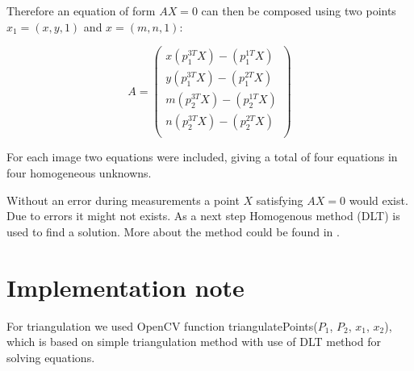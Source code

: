 Therefore an equation of form $AX = 0$ can then be composed using two points $x_1 = (x, y, 1)$ and $x = (m, n, 1)$:

\[
A = \begin{pmatrix}
x(p_1^{3T}X) - (p_1^{1T}X) \\
y(p_1^{3T}X) - (p_1^{2T}X) \\
m(p_2^{3T}X) - (p_2^{1T}X) \\
n(p_2^{3T}X) - (p_2^{2T}X) \\
\end{pmatrix}
\]

For each image two equations were included, giving a total of four equations in
four homogeneous unknowns.

Without an error during measurements a point $X$ satisfying $AX = 0$ would
exist. Due to errors it might not exists. As a next step Homogenous method
(DLT) is used to find a solution. More about the method could be found in \citet*{multiple-view-geometry}.

\section{Implementation note}
For triangulation we used OpenCV function triangulatePoints($P_1$, $P_2$,
$x_1$, $x_2$), which is based on simple triangulation method with use of DLT
method for solving equations.
